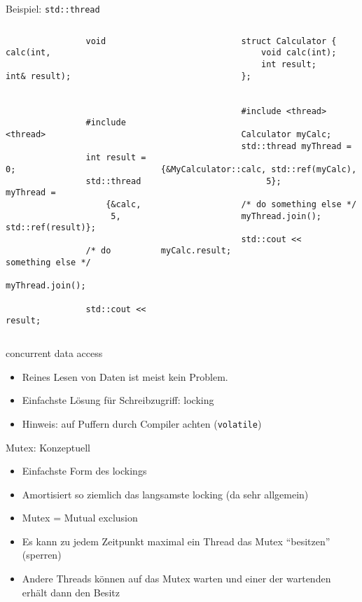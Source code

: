 \begin{frame}[fragile]{Beispiel: \texttt{std::thread}}
	\begin{columns}[b]
			\begin{lstlisting}
				void calc(int,
				          int& result);
				
				
				
				#include <thread>
				
				int result = 0;
				std::thread myThread =
					{&calc,
					 5, std::ref(result)};
					 
				/* do something else */
				myThread.join();
				
				std::cout << result;
			\end{lstlisting}
		
		\pause
		
			\begin{lstlisting}
				struct Calculator {
					void calc(int);
					int result;
				};
				
				
				#include <thread>
				
				Calculator myCalc;
				std::thread myThread =
					{&MyCalculator::calc, std::ref(myCalc),
					 5};
				
				/* do something else */
				myThread.join();
				
				std::cout << myCalc.result;
			\end{lstlisting}
	\end{columns}
\end{frame}

\begin{frame}{concurrent data access}
	\begin{itemize}
		\item Reines Lesen von Daten ist meist kein Problem.
		\item Einfachste Lösung für Schreibzugriff: locking
		\item Hinweis: auf Puffern durch Compiler achten (\texttt{volatile})
	\end{itemize}
	
	\pause
	
	\begin{block}{Mutex: Konzeptuell}
		\begin{itemize}
			\item Einfachste Form des lockings
			\item Amortisiert so ziemlich das langsamste locking (da sehr allgemein)
			\item Mutex = Mutual exclusion
			\item Es kann zu jedem Zeitpunkt maximal ein Thread das Mutex \enquote{besitzen} (sperren)
			\item Andere Threads können auf das Mutex warten und einer der wartenden erhält dann den Besitz
		\end{itemize}
	\end{block}
\end{frame}

